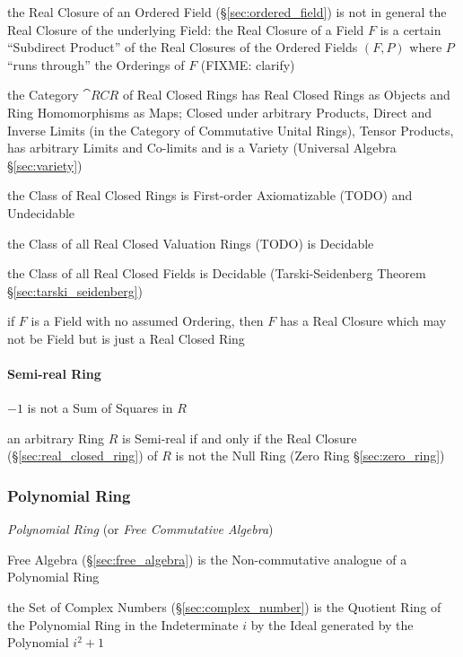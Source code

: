 the Real Closure of an Ordered Field (\S\ref{sec:ordered_field}) is not in
general the Real Closure of the underlying Field: the Real Closure of a Field
$F$ is a certain ``Subdirect Product'' of the Real Closures of the Ordered
Fields $(F,P)$ where $P$ ``runs through'' the Orderings of $F$ (FIXME: clarify)

the Category $\cat{RCR}$ of Real Closed Rings has Real Closed Rings as Objects
and Ring Homomorphisms as Maps; Closed under arbitrary Products, Direct and
Inverse Limits (in the Category of Commutative Unital Rings), Tensor Products,
has arbitrary Limits and Co-limits and is a Variety (Universal Algebra
\S\ref{sec:variety})

the Class of Real Closed Rings is First-order Axiomatizable (TODO) and
Undecidable

the Class of all Real Closed Valuation Rings (TODO) is Decidable

the Class of all Real Closed Fields is Decidable (\fist Tarski-Seidenberg
Theorem \S\ref{sec:tarski_seidenberg})

if $F$ is a Field with no assumed Ordering, then $F$ has a Real Closure which
may not be Field but is just a Real Closed Ring



\paragraph{Semi-real Ring}\label{sec:semireal_ring}\hfill

$-1$ is not a Sum of Squares in $R$

an arbitrary Ring $R$ is Semi-real if and only if the Real Closure
(\S\ref{sec:real_closed_ring}) of $R$ is not the Null Ring (Zero Ring
\S\ref{sec:zero_ring})



\subsubsection{Polynomial Ring}\label{sec:polynomial_ring}

\emph{Polynomial Ring} (or \emph{Free Commutative Algebra})

Free Algebra (\S\ref{sec:free_algebra}) is the Non-commutative
analogue of a Polynomial Ring

the Set of Complex Numbers (\S\ref{sec:complex_number}) is the Quotient Ring of
the Polynomial Ring in the Indeterminate $i$ by the Ideal generated by the
Polynomial $i^2 + 1$

